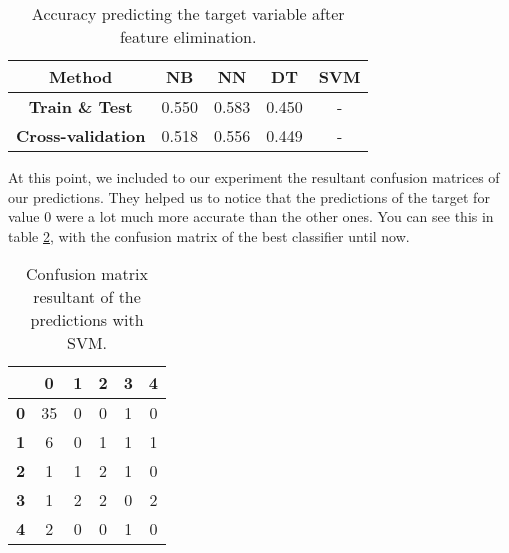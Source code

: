 \begin{table}[hbtp]
    \centering
    \begin{tabular}{c c c c c}
        \toprule
        \textbf{Method} & \textbf{NB} & \textbf{NN} & \textbf{DT} & \textbf{SVM} \\ \midrule
        \textbf{Train \& Test} & 0.550 & 0.583 & 0.450 & - \\
        \textbf{Cross-validation} & 0.518 & 0.556 & 0.449 & - \\
        \bottomrule
    \end{tabular}
    \caption{Accuracy predicting the target variable after feature elimination.}
    \label{tab:first_exp_fe}
\end{table}

At this point, we included to our experiment the resultant confusion matrices of our predictions. They helped us to notice that the predictions of the target for value 0 were a lot much more accurate than the other ones. You can see this in table \ref{tab:first_exp_cm}, with the confusion matrix of the best classifier until now. 

\begin{table}[hbtp]
    \centering
    \begin{tabular}{c c c c c c}
        \toprule
         & \textbf{0} & \textbf{1} & \textbf{2} & \textbf{3} & \textbf{4} \\ \midrule
        \textbf{0} & 35 & 0 & 0 & 1 & 0 \\
        \textbf{1} & 6 & 0 & 1 & 1 & 1 \\
        \textbf{2} & 1 & 1 & 2 & 1 & 0 \\
        \textbf{3} & 1 & 2 & 2 & 0 & 2 \\
        \textbf{4} & 2 & 0 & 0 & 1 & 0 \\
        \bottomrule
    \end{tabular}
    \caption{Confusion matrix resultant of the predictions with SVM.}
    \label{tab:first_exp_cm}
\end{table}

